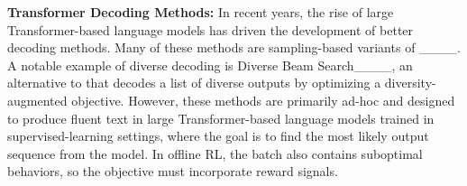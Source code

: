 \textbf{Transformer Decoding Methods:}
In recent years, the rise of large Transformer-based language models has driven the development of better decoding methods. Many of these methods are sampling-based variants of \bs____. 
A notable example of diverse decoding is Diverse Beam Search____, an alternative to \bs{} that decodes a list of diverse outputs by optimizing a diversity-augmented objective. However, these methods are primarily ad-hoc and designed to produce fluent text in large Transformer-based language models trained in supervised-learning settings, where the goal is to find the most likely output sequence from the model. In offline RL, the batch also contains suboptimal behaviors, so the objective must incorporate reward signals.
